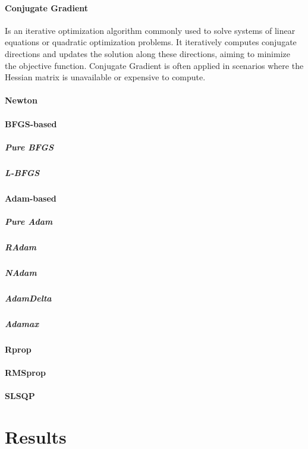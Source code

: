 \documentclass[a4paper]{article}
\begin{document}
	\paragraph{Conjugate Gradient}
	Is an iterative optimization algorithm commonly used to solve systems of linear equations or quadratic optimization problems.
	It iteratively computes conjugate directions and updates the solution along these directions, aiming to minimize the objective function.
	Conjugate Gradient is often applied in scenarios where the Hessian matrix is unavailable or expensive to compute.

	\paragraph{Newton}

	\paragraph{BFGS-based}
	\subparagraph{Pure BFGS}
	\subparagraph{L-BFGS}

	\paragraph{Adam-based}
	\subparagraph{Pure Adam}
	\subparagraph{RAdam}
	\subparagraph{NAdam}
	\subparagraph{AdamDelta}
	\subparagraph{Adamax}

	\paragraph{Rprop}
	
	\paragraph{RMSprop}
	
	\paragraph{SLSQP}
	
	
	
	\section{Results}
\end{document}
